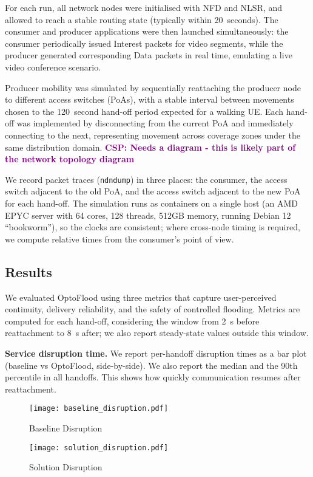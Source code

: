 \documentclass[10pt,conference]{IEEEtran}
\newcommand{\csp}[1]{\textbf{\textcolor{purple}{CSP: #1}}}
\begin{document}
For each run, all network nodes were initialised with NFD and NLSR, and allowed to reach a stable routing state (typically within 20~seconds). The consumer and producer applications were then launched simultaneously: the consumer periodically issued Interest packets for video segments, while the producer generated corresponding Data packets in real time, emulating a live video conference scenario.

Producer mobility was simulated by sequentially reattaching the producer node to different access switches (PoAs), with a stable interval between movements chosen to the 120~second hand-off period expected for a walking UE. Each hand-off was implemented by disconnecting from the current PoA and immediately connecting to the next, representing movement across coverage zones under the same distribution domain.
\csp{Needs a diagram - this is likely part of the network topology diagram}


We record packet traces (\texttt{ndndump}) in three places: the consumer, the access switch adjacent to the old PoA, and the access switch adjacent to the new PoA for each hand-off. 
The simulation runs as containers on a single host (an AMD EPYC server with 64 cores, 128 threads, 512GB memory, running Debian 12 ``bookworm''), so the clocks are consistent; where cross-node timing is required, we compute relative times from the consumer’s point of view.


\subsection{Results}

We evaluated OptoFlood using three metrics that capture user-perceived continuity, delivery reliability, and the safety of controlled flooding. 
Metrics are computed for each hand-off, considering the window from 2~s before reattachment to 8~s after; we also report steady-state values outside this window.

\textbf{Service disruption time.}
We report per-handoff disruption times as a bar plot (baseline vs OptoFlood, side-by-side). We also report the median and the 90th percentile in all handoffs. This shows how quickly communication resumes after reattachment.
\begin{figure}
    \centering
    \texttt{[image: baseline\_disruption.pdf]}
    \caption{Baseline Disruption}
    \label{fig:baseline_disruption}
\end{figure}
\begin{figure}
    \centering
    \texttt{[image: solution\_disruption.pdf]}
    \caption{Solution Disruption}
    \label{fig:solution_disruption}
\end{figure}
\end{document}
